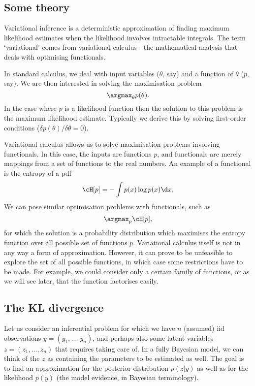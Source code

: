 \subsection{Some theory}

Variational inference is a deterministic approximation of finding maximum likelihood estimates when the likelihood involves intractable integrals. The term `variational' comes from variational calculus - the mathematical analysis that deals with optimising functionals. 

In standard calculus, we deal with input variables ($\theta$, say) and a function of $\theta$ ($p$, say). We are then interested in solving the maximisation problem 
\[
  \argmax_\theta p(\theta).
\]
In the case where $p$ is a likelihood function then the solution to this problem is the maximum likelihood estimate. Typically we derive this by solving first-order conditions ($\delta p(\theta)/\delta\theta = 0$).

Variational calculus allows us to solve maximisation problems involving functionals. In this case, the inputs are functions $p$, and functionals are merely mappings from a set of functions to the real numbers. An example of a functional is the entropy of a pdf
\[
  \cH[p] = - \int p(x) \log p(x) \d x.
\]
We can pose similar optimisation problems with functionals, such as
\[
  \argmax_p \cH[p],
\]
for which the solution is a probability distribution which maximises the entropy function over all possible set of functions $p$. Variational calculus itself is not in any way a form of approximation. However, it can prove to be unfeasible to explore the set of all possible functions, in which case some restrictions have to be made. For example, we could consider only a certain family of functions, or as we will see later, that the function factorises easily.

\subsection{The KL divergence}

Let us consider an inferential problem for which we have $n$ (assumed) iid observations $y = (y_1,\dots,y_n)$, and perhaps also some latent variables $z = (z_1, \dots, z_n)$ that requires taking care of. In a fully Bayesian model, we can think of the $z$ as containing the parameters to be estimated as well. The goal is to find an approximation for the posterior distribution $p(z|y)$ as well as for the likelihood $p(y)$ (the model evidence, in Bayesian terminology).

